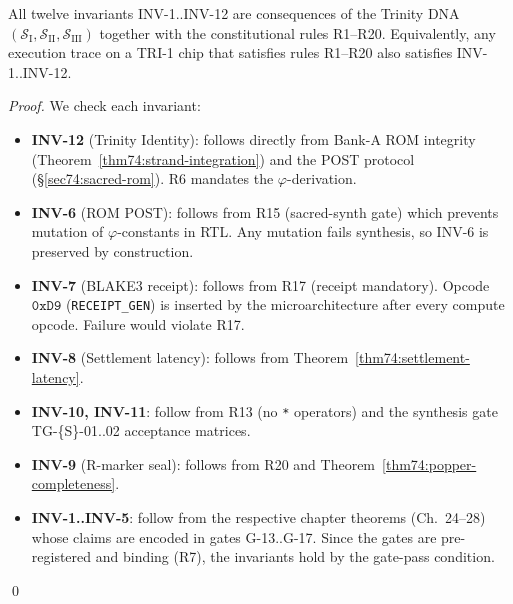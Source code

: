 \begin{theorem}
\label{thm74:inv-closure}
All twelve invariants INV-1..INV-12 are consequences of the Trinity DNA
$(\mathcal{S}_{\mathrm{I}}, \mathcal{S}_{\mathrm{II}},
\mathcal{S}_{\mathrm{III}})$ together with the constitutional rules R1--R20.
Equivalently, any execution trace on a TRI-1 chip that satisfies rules R1--R20
also satisfies INV-1..INV-12.
\end{theorem}
\begin{proof}
We check each invariant:
\begin{itemize}
  \item \textbf{INV-12} (Trinity Identity): follows directly from Bank-A ROM
    integrity (Theorem~\ref{thm74:strand-integration}) and the POST protocol
    (\S\ref{sec74:sacred-rom}).  R6 mandates the $\varphi$-derivation.
  \item \textbf{INV-6} (ROM POST): follows from R15 (sacred-synth gate) which
    prevents mutation of $\varphi$-constants in RTL.  Any mutation fails
    synthesis, so INV-6 is preserved by construction.
  \item \textbf{INV-7} (BLAKE3 receipt): follows from R17 (receipt mandatory).
    Opcode $\mathtt{0xD9}$ (\texttt{RECEIPT\_GEN}) is inserted by the
    microarchitecture after every compute opcode.  Failure would violate R17.
  \item \textbf{INV-8} (Settlement latency): follows from
    Theorem~\ref{thm74:settlement-latency}.
  \item \textbf{INV-10, INV-11}: follow from R13 (no \texttt{*} operators)
    and the synthesis gate TG-\{S\}-01..02 acceptance matrices.
  \item \textbf{INV-9} (R-marker seal): follows from R20 and
    Theorem~\ref{thm74:popper-completeness}.
  \item \textbf{INV-1..INV-5}: follow from the respective chapter theorems
    (Ch.~24--28) whose claims are encoded in gates G-13..G-17.  Since the
    gates are pre-registered and binding (R7), the invariants hold by the
    gate-pass condition.
\end{itemize}
\qed
\end{proof}



